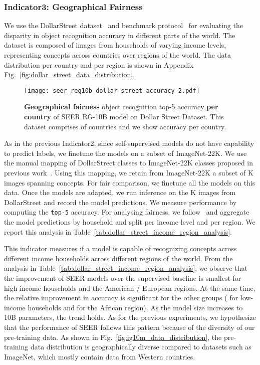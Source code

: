 \documentclass[10pt,twocolumn,letterpaper]{article}
\newcommand{\ImNetFull}{ImageNet-22K\xspace}
\newcommand{\dollarstreet}{DollarStreet\xspace}
\begin{document}
\subsubsection{Indicator3: Geographical Fairness}
\label{sec:geo_fairness_dollar_street}

We use the \dollarstreet dataset~\cite{de2019does} and benchmark protocol~\cite{goyal2022fairness} for evaluating the disparity in object recognition accuracy in different parts of the world. 
The dataset is composed of  images from  households of varying income levels, representing  concepts across  countries over  regions of the world. 
The data distribution per country and per region is shown in Appendix Fig.~\ref{fig:dollar_street_data_distribution}.

\begin{figure}[h]
  \centering
    \texttt{[image: seer\_reg10b\_dollar\_street\_accuracy\_2.pdf]}
  \caption{
    \textbf{Geographical fairness} object recognition top-5 accuracy \textbf{per country} of SEER RG-10B model on Dollar Street Dataset. This dataset comprises of  countries and we show accuracy per country.
      }
  \label{fig:seer_rg256_dollar_street_accuracy} \end{figure}

As in the previous Indicator2, since self-supervised models do not have capability to predict labels, we finetune the models on a subset of \ImNetFull.
We use the manual mapping of \dollarstreet classes to \ImNetFull classes proposed in previous work~\cite{goyal2022fairness}.
Using this mapping, we retain from \ImNetFull a subset of K images spanning  concepts. 
For fair comparison, we finetune all the models on this data. 
Once the models are adapted, we run inference on the K images from \dollarstreet and record the model predictions. 
We measure performance by computing the \texttt{top-5} accuracy. 
For analysing fairness, we follow~\cite{goyal2022fairness} and aggregate the model predictions by household and split per income level and per region.
We report this analysis in Table~\ref{tab:dollar_street_income_region_analysis}.

This indicator measures if a model is capable of recognizing concepts across different income households across different regions of the world. 
From the analysis in Table~\ref{tab:dollar_street_income_region_analysis}, we observe that the improvement of SEER models over the supervised baseline is smallest for high income households and the American / European regions.
At the same time, the relative improvement in accuracy is significant for the other groups ( for low-income households and  for the African region). As the model size increases to 10B parameters, the trend holds.
As for the previous experiments, we hypothesize that the performance of SEER follows this pattern because of the diversity of our pre-training data.
As shown in Fig.~\ref{fig:ig10m_data_distribution}, the pre-training data distribution is geographically diverse compared to datasets such as ImageNet, which mostly contain data from Western countries.
\end{document}
